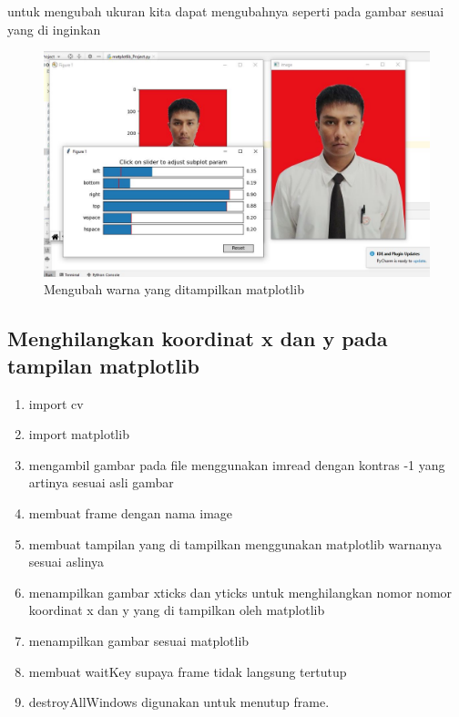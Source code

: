 \newpage
untuk mengubah ukuran kita dapat mengubahnya seperti pada gambar sesuai yang di inginkan
\begin{figure}[ht]
\centering
\includegraphics[scale=0.4]{figures/2,47,1.jpg}
\caption{Mengubah warna yang ditampilkan matplotlib}
\label{contoh}
\end{figure}





\newpage
\subsection{Menghilangkan koordinat x dan y pada tampilan matplotlib}

\begin{enumerate}
	\item import cv
	\item import matplotlib
	\item mengambil gambar pada file menggunakan imread dengan kontras -1 yang artinya sesuai asli gambar
	\item membuat frame dengan nama image
	\item membuat tampilan yang di tampilkan menggunakan matplotlib warnanya sesuai aslinya
	\item menampilkan gambar
	\gunakan xticks dan yticks untuk menghilangkan nomor nomor koordinat x dan y yang di tampilkan oleh matplotlib
	\item menampilkan gambar sesuai matplotlib
	\item membuat waitKey supaya frame tidak langsung tertutup
	\item destroyAllWindows digunakan untuk menutup frame.
\end{enumerate}

